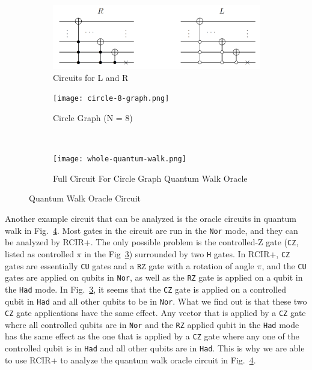 \begin{figure}[h]
\centering
     \begin{subfigure}[b]{0.6\textwidth}
         \centering
         \includegraphics[width=1\textwidth]{lr-circuit.png}
         \caption{Circuits for L and R}
         \label{fig:lr-graph}
     \end{subfigure}

     \begin{subfigure}[b]{0.3\textwidth}
         \centering
         \texttt{[image: circle-8-graph.png]}
         \caption{Circle Graph (N = 8)}
         \label{fig:circle}
     \end{subfigure}%
     ~
     \begin{subfigure}[b]{0.7\textwidth}
         \centering
         \texttt{[image: whole-quantum-walk.png]}
         \caption{Full Circuit For Circle Graph Quantum Walk Oracle}
         \label{fig:quantum-walk-circle}
     \end{subfigure}

\caption{Quantum Walk Oracle Circuit}
\label{fig:circle-circuit}
\end{figure}

Another example circuit that can be analyzed is the oracle circuits in quantum walk in Fig.~\ref{fig:circle-circuit}. 
Most gates in the circuit are run in the \texttt{Nor} mode, and they can be analyzed by RCIR+. The only possible problem is the controlled-Z gate (\texttt{CZ}, listed as controlled $\pi$ in the Fig~\ref{fig:quantum-walk-circle}) surrounded by two \texttt{H} gates. In RCIR+, \texttt{CZ} gates are essentially \texttt{CU} gates and a $\texttt{RZ}$ gate with a rotation of angle $\pi$, and the \texttt{CU} gates are applied on qubits in \texttt{Nor}, as well as the \texttt{RZ} gate is applied on a qubit in the \texttt{Had} mode.
In Fig.~\ref{fig:quantum-walk-circle}, it seems that the \texttt{CZ} gate is applied on a controlled qubit in \texttt{Had} and all other qubits to be in \texttt{Nor}. What we find out is that these two \texttt{CZ} gate applications have the same effect. Any vector that is applied by a \texttt{CZ} gate where all controlled qubits are in \texttt{Nor} and the \texttt{RZ} applied qubit in the \texttt{Had} mode has the same effect as the one that is applied by a \texttt{CZ} gate where any one of the controlled qubit is in \texttt{Had} and all other qubits are in \texttt{Had}. This is why we are able to use RCIR+ to analyze the quantum walk oracle circuit in Fig.~\ref{fig:circle-circuit}.

